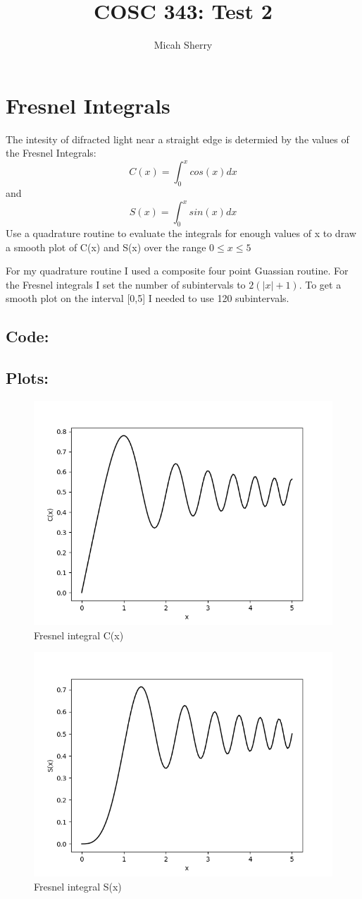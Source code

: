 \documentclass{article}
\title{COSC 343: Test 2}
\author{Micah Sherry}
\begin{document}
\maketitle
\section{Fresnel Integrals}
	The intesity of difracted light near a straight edge is determied by the values of the Fresnel Integrals: 
	$$C(x) = \int_{0}^x cos(x)dx $$ and $$S(x) = \int_{0}^x sin(x)dx $$
	Use a quadrature routine to evaluate the integrals for enough values of x to draw a smooth plot of C(x) and S(x) over the range
	$0 \le x \le 5$

	For my quadrature routine I used a composite four point Guassian routine. 
	For the Fresnel integrals I set the number of subintervals to $2(|x|+1)$.     
	To get a smooth plot on the interval [0,5] I needed to use 120 subintervals.
\subsection{Code:}
	
\subsection*{Plots:}
	\begin{figure}[hbt!]
		\centering
		\includegraphics[width=.75\linewidth]{C(x)_plot.png}
		\caption{Fresnel integral C(x)}
		\label{fig: Fresnel integrals C(x)}
	\end{figure}
	
	\begin{figure}[hbt!]
		\centering
		\includegraphics[width=.75\linewidth]{S(x)_plot.png}
		\caption{Fresnel integral S(x)}
		\label{fig: Fresnel integrals S(x)}
	\end{figure}
\end{document}

